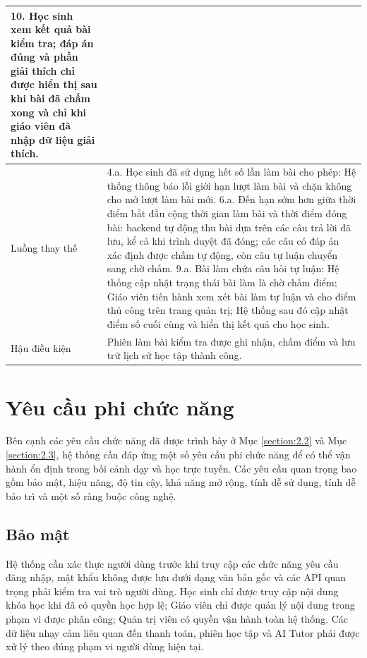 ﻿\documentclass[../DoAn.tex]{subfiles}
\begin{document}
\begin{longtable}{|p{3.5cm}|p{10.5cm}|}
10. Học sinh xem kết quả bài kiểm tra; đáp án đúng và phần giải thích chỉ được hiển thị sau khi bài đã chấm xong và chỉ khi giáo viên đã nhập dữ liệu giải thích. \\ \hline
Luồng thay thế & 
4.a. Học sinh đã sử dụng hết số lần làm bài cho phép: Hệ thống thông báo lỗi giới hạn lượt làm bài và chặn không cho mở lượt làm bài mới. \newline
6.a. Đến hạn sớm hơn giữa thời điểm bắt đầu cộng thời gian làm bài và thời điểm đóng bài: backend tự động thu bài dựa trên các câu trả lời đã lưu, kể cả khi trình duyệt đã đóng; các câu có đáp án xác định được chấm tự động, còn câu tự luận chuyển sang chờ chấm. \newline
9.a. Bài làm chứa câu hỏi tự luận: Hệ thống cập nhật trạng thái bài làm là chờ chấm điểm; Giáo viên tiến hành xem xét bài làm tự luận và cho điểm thủ công trên trang quản trị; Hệ thống sau đó cập nhật điểm số cuối cùng và hiển thị kết quả cho học sinh. \\ \hline
Hậu điều kiện & Phiên làm bài kiểm tra được ghi nhận, chấm điểm và lưu trữ lịch sử học tập thành công. \\ \hline
\end{longtable}
\endgroup

\section{Yêu cầu phi chức năng}
\label{section:2.4}

Bên cạnh các yêu cầu chức năng đã được trình bày ở Mục \ref{section:2.2} và Mục \ref{section:2.3}, hệ thống cần đáp ứng một số yêu cầu phi chức năng để có thể vận hành ổn định trong bối cảnh dạy và học trực tuyến. Các yêu cầu quan trọng bao gồm bảo mật, hiệu năng, độ tin cậy, khả năng mở rộng, tính dễ sử dụng, tính dễ bảo trì và một số ràng buộc công nghệ.

\subsection{Bảo mật}
\label{subsection:2.4.1}

Hệ thống cần xác thực người dùng trước khi truy cập các chức năng yêu cầu đăng nhập, mật khẩu không được lưu dưới dạng văn bản gốc và các API quan trọng phải kiểm tra vai trò người dùng. Học sinh chỉ được truy cập nội dung khóa học khi đã có quyền học hợp lệ; Giáo viên chỉ được quản lý nội dung trong phạm vi được phân công; Quản trị viên có quyền vận hành toàn hệ thống. Các dữ liệu nhạy cảm liên quan đến thanh toán, phiên học tập và AI Tutor phải được xử lý theo đúng phạm vi người dùng hiện tại.
\end{document}
